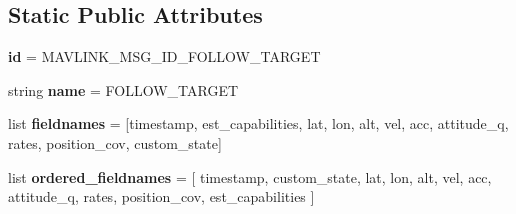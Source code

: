 \subsection*{Static Public Attributes}
\begin{DoxyCompactItemize}
\item 
\mbox{\label{classpymavlink_1_1dialects_1_1v10_1_1MAVLink__follow__target__message_ab076b72057360af00f0e547721f3a132}} 
{\bfseries id} = M\+A\+V\+L\+I\+N\+K\+\_\+\+M\+S\+G\+\_\+\+I\+D\+\_\+\+F\+O\+L\+L\+O\+W\+\_\+\+T\+A\+R\+G\+ET
\item 
\mbox{\label{classpymavlink_1_1dialects_1_1v10_1_1MAVLink__follow__target__message_a763b486f3f1bbde61cc1d95ece58226e}} 
string {\bfseries name} = \textquotesingle{}F\+O\+L\+L\+O\+W\+\_\+\+T\+A\+R\+G\+ET\textquotesingle{}
\item 
\mbox{\label{classpymavlink_1_1dialects_1_1v10_1_1MAVLink__follow__target__message_a44c10fb6101c1ceb68ffbe99227101c7}} 
list {\bfseries fieldnames} = \mbox{[}\textquotesingle{}timestamp\textquotesingle{}, \textquotesingle{}est\+\_\+capabilities\textquotesingle{}, \textquotesingle{}lat\textquotesingle{}, \textquotesingle{}lon\textquotesingle{}, \textquotesingle{}alt\textquotesingle{}, \textquotesingle{}vel\textquotesingle{}, \textquotesingle{}acc\textquotesingle{}, \textquotesingle{}attitude\+\_\+q\textquotesingle{}, \textquotesingle{}rates\textquotesingle{}, \textquotesingle{}position\+\_\+cov\textquotesingle{}, \textquotesingle{}custom\+\_\+state\textquotesingle{}\mbox{]}
\item 
\mbox{\label{classpymavlink_1_1dialects_1_1v10_1_1MAVLink__follow__target__message_aa00d4ec46bffa7d641d602359a314900}} 
list {\bfseries ordered\+\_\+fieldnames} = \mbox{[} \textquotesingle{}timestamp\textquotesingle{}, \textquotesingle{}custom\+\_\+state\textquotesingle{}, \textquotesingle{}lat\textquotesingle{}, \textquotesingle{}lon\textquotesingle{}, \textquotesingle{}alt\textquotesingle{}, \textquotesingle{}vel\textquotesingle{}, \textquotesingle{}acc\textquotesingle{}, \textquotesingle{}attitude\+\_\+q\textquotesingle{}, \textquotesingle{}rates\textquotesingle{}, \textquotesingle{}position\+\_\+cov\textquotesingle{}, \textquotesingle{}est\+\_\+capabilities\textquotesingle{} \mbox{]}

\end{DoxyCompactItemize}
